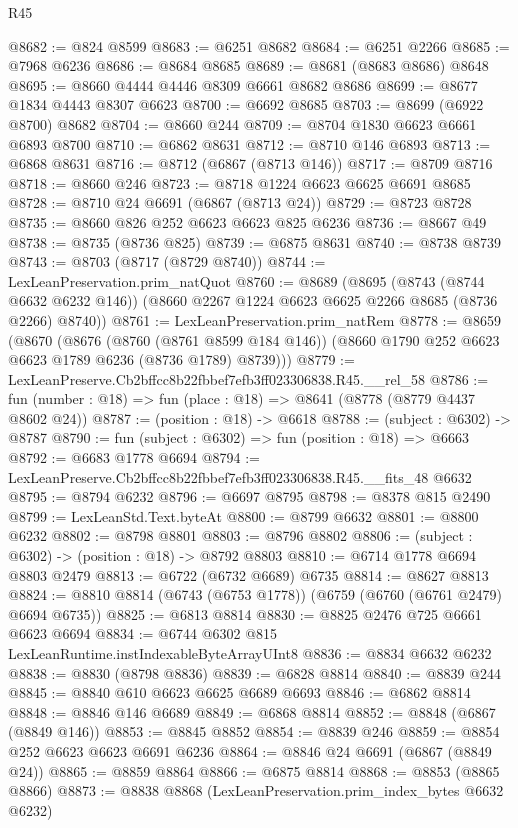 \begin{lexlean}{R45}
\begin{coremodule}
{@8682 := @824 @8599
@8683 := @6251 @8682
@8684 := @6251 @2266
@8685 := @7968 @6236
@8686 := @8684 @8685
@8689 := @8681 (@8683 @8686) @8648
@8695 := @8660 @4444 @4446 @8309 @6661 @8682 @8686
@8699 := @8677 @1834 @4443 @8307 @6623
@8700 := @6692 @8685
@8703 := @8699 (@6922 @8700) @8682
@8704 := @8660 @244
@8709 := @8704 @1830 @6623 @6661 @6893 @8700
@8710 := @6862 @8631
@8712 := @8710 @146 @6893
@8713 := @6868 @8631
@8716 := @8712 (@6867 (@8713 @146))
@8717 := @8709 @8716
@8718 := @8660 @246
@8723 := @8718 @1224 @6623 @6625 @6691 @8685
@8728 := @8710 @24 @6691 (@6867 (@8713 @24))
@8729 := @8723 @8728
@8735 := @8660 @826 @252 @6623 @6623 @825 @6236
@8736 := @8667 @49
@8738 := @8735 (@8736 @825)
@8739 := @6875 @8631
@8740 := @8738 @8739
@8743 := @8703 (@8717 (@8729 @8740))
@8744 := LexLeanPreservation.prim_natQuot
@8760 := @8689
    (@8695
      (@8743 (@8744 @6632 @6232 @146))
      (@8660 @2267 @1224 @6623 @6625 @2266 @8685 (@8736 @2266) @8740))
@8761 := LexLeanPreservation.prim_natRem
@8778 := @8659
    (@8670
      (@8676
        (@8760 (@8761 @8599 @184 @146))
        (@8660 @1790 @252 @6623 @6623 @1789 @6236 (@8736 @1789) @8739)))
@8779 := LexLeanPreserve.Cb2bffcc8b22fbbef7efb3ff023306838.R45.__rel_58
@8786 := fun (number : @18) => fun (place : @18) => @8641 (@8778 (@8779 @4437 @8602 @24))
@8787 := (position : @18) -> @6618
@8788 := (subject : @6302) -> @8787
@8790 := fun (subject : @6302) => fun (position : @18) => @6663
@8792 := @6683 @1778 @6694
@8794 := LexLeanPreserve.Cb2bffcc8b22fbbef7efb3ff023306838.R45.__fits_48 @6632
@8795 := @8794 @6232
@8796 := @6697 @8795
@8798 := @8378 @815 @2490
@8799 := LexLeanStd.Text.byteAt
@8800 := @8799 @6632
@8801 := @8800 @6232
@8802 := @8798 @8801
@8803 := @8796 @8802
@8806 := (subject : @6302) -> (position : @18) -> @8792 @8803
@8810 := @6714 @1778 @6694 @8803 @2479
@8813 := @6722 (@6732 @6689) @6735
@8814 := @8627 @8813
@8824 := @8810 @8814 (@6743 (@6753 @1778)) (@6759 (@6760 (@6761 @2479) @6694 @6735))
@8825 := @6813 @8814
@8830 := @8825 @2476 @725 @6661 @6623 @6694
@8834 := @6744 @6302 @815 LexLeanRuntime.instIndexableByteArrayUInt8
@8836 := @8834 @6632 @6232
@8838 := @8830 (@8798 @8836)
@8839 := @6828 @8814
@8840 := @8839 @244
@8845 := @8840 @610 @6623 @6625 @6689 @6693
@8846 := @6862 @8814
@8848 := @8846 @146 @6689
@8849 := @6868 @8814
@8852 := @8848 (@6867 (@8849 @146))
@8853 := @8845 @8852
@8854 := @8839 @246
@8859 := @8854 @252 @6623 @6623 @6691 @6236
@8864 := @8846 @24 @6691 (@6867 (@8849 @24))
@8865 := @8859 @8864
@8866 := @6875 @8814
@8868 := @8853 (@8865 @8866)
@8873 := @8838 @8868 (LexLeanPreservation.prim_index_bytes @6632 @6232)
}
\end{coremodule}
\end{lexlean}
